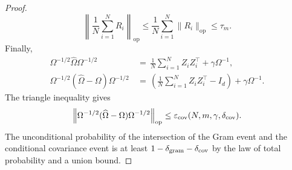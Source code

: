 \documentclass{article} %
\begin{document}
\begin{proof}
\begin{equation}
\left\|\frac1N\sum_{i=1}^N R_i\right\|_{\mathrm{op}}
\leq
\frac1N\sum_{i=1}^N\|R_i\|_{\mathrm{op}}
\leq
\tau_m.
\end{equation}
Finally,
\begin{equation}
\begin{aligned}
\Omega^{-1/2}\widehat\Omega\Omega^{-1/2}
&\,=\,
\frac1N\sum_{i=1}^N Z_iZ_i^\top+\gamma\Omega^{-1},
\\
\Omega^{-1/2}(\widehat\Omega-\Omega)\Omega^{-1/2}
&\,=\,
\left(\frac1N\sum_{i=1}^N Z_iZ_i^\top-I_d\right)+\gamma\Omega^{-1}.
\end{aligned}
\end{equation}
The triangle inequality gives
\begin{equation}
\left\|
\Omega^{-1/2}(\widehat\Omega-\Omega)\Omega^{-1/2}
\right\|_{\mathrm{op}}
\leq
\varepsilon_{\rm cov}(N,m,\gamma,\delta_{\rm cov}).
\end{equation}
The unconditional probability of the intersection of the Gram event and the
conditional covariance event is at least
\(1-\delta_{\rm gram}-\delta_{\rm cov}\) by the law of total probability and a
union bound.
\end{proof}
\end{document}
